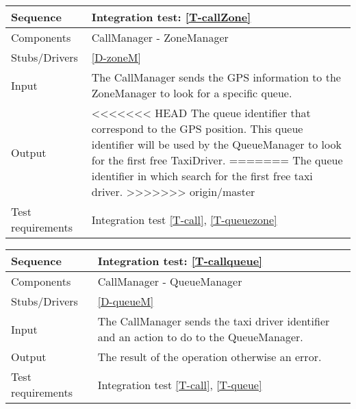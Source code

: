 \begin{table}[H]
    \begin{tabularx}{\textwidth}{l|X}
        \hline
        Sequence
        & 
        Integration test: \ref{T-callZone}
        \\ \hline
        Components 
        & 
        CallManager - ZoneManager
        \\ \hline
        Stubs/Drivers 
        & 
        \ref{D-zoneM}
        \\ \hline
        Input 
        & 
        The CallManager sends the GPS information to the ZoneManager to look for a specific queue.
        \\ \hline
        Output 
        & 
<<<<<<< HEAD
        The queue identifier that correspond to the GPS position. This queue identifier will be used by the QueueManager to look for the first free TaxiDriver.
=======
        The queue identifier in which search for the first free taxi driver.
>>>>>>> origin/master
        \\ \hline
        Test requirements 
        & 
        Integration test \ref{T-call}, \ref{T-queuezone}
        \\ \hline
    \end{tabularx}
\end{table}

\begin{table}[H]
    \begin{tabularx}{\textwidth}{l|X}
        \hline
        Sequence
        & 
        Integration test: \ref{T-callqueue}
        \\ \hline
        Components 
        & 
        CallManager - QueueManager
        \\ \hline
        Stubs/Drivers 
        & 
        \ref{D-queueM}
        \\ \hline
        Input 
        & 
        The CallManager sends the taxi driver identifier and an action to do to the QueueManager.
        \\ \hline
        Output 
        & 
        The result of the operation otherwise an error.
        \\ \hline
        Test requirements 
        & 
        Integration test \ref{T-call}, \ref{T-queue}
        \\ \hline
    \end{tabularx}
\end{table}
